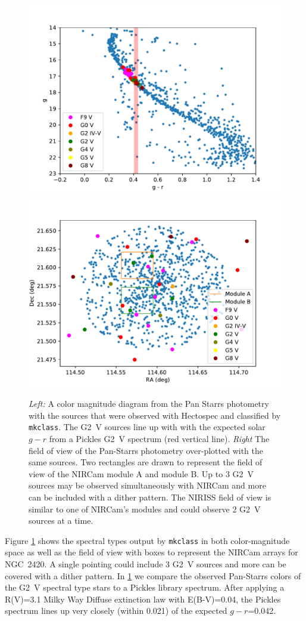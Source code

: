 \documentclass{aastex6}
\begin{document}
\begin{figure}[!hbtp]
\centering
\includegraphics[width=.49\columnwidth]{colormagNGC_2420.pdf}
\includegraphics[width=.49\columnwidth]{fovNGC_2420.pdf}
\caption{{\it Left:} A color magnitude diagram from the Pan Starrs photometry with the sources that were observed with Hectospec and classified by \texttt{mkclass}.
The G2~V sources line up with with the expected solar $g-r$ from a Pickles G2~V spectrum (red vertical line).
{\it Right} The field of view of the Pan-Starrs photometry over-plotted with the same sources.
Two rectangles are drawn to represent the field of view of the NIRCam module A and module B. Up to 3 G2~V sources may be observed simultaneously with NIRCam and more can be included with a dither pattern.
The NIRISS field of view is similar to one of NIRCam's modules and could observe 2 G2~V sources at a time. }\label{fig:ngc2420ClassCM}
\end{figure}

Figure \ref{fig:ngc2420ClassCM} shows the spectral types output by \texttt{mkclass} in both color-magnitude space as well as the field of view with boxes to represent the NIRCam arrays for NGC~2420.
A single pointing could include 3 G2~V sources and more can be covered with a dither pattern.
In \ref{fig:ngc2420ClassCM} we compare the observed Pan-Starrs colors of the G2~V spectral type stars to a Pickles library spectrum.
After applying a R(V)=3.1 \citet{cardelli1989} Milky Way Diffuse extinction law with E(B-V)=0.04, the Pickles spectrum lines up very closely (within 0.021) of the expected $g-r$=0.042.
\end{document}

